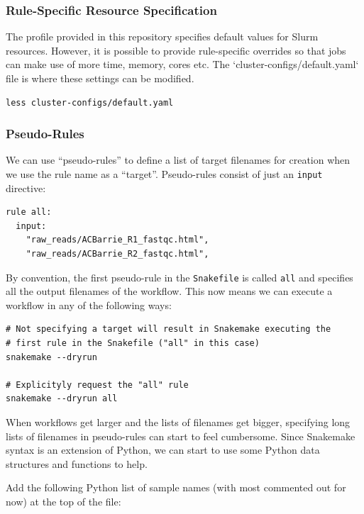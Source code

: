 \subsubsection{Rule-Specific Resource Specification}

The profile provided in this repository specifies default values for Slurm resources.
However, it is possible to provide rule-specific overrides so that jobs can make use of more time, memory, cores etc.
The `cluster-configs/default.yaml` file is where these settings can be modified.

\begin{lstlisting}
less cluster-configs/default.yaml
\end{lstlisting}

\subsubsection{Pseudo-Rules}

We can use ``pseudo-rules'' to define a list of target filenames for creation when we use the rule name as a ``target''.
Pseudo-rules consist of just an \texttt{input} directive:

\begin{lstlisting}
rule all:
  input:
    "raw_reads/ACBarrie_R1_fastqc.html",
    "raw_reads/ACBarrie_R2_fastqc.html",
\end{lstlisting}

By convention, the first pseudo-rule in the \texttt{Snakefile} is called \texttt{all} and specifies all the output filenames of the workflow.
This now means we can execute a workflow in any of the following ways:

\begin{lstlisting}
# Not specifying a target will result in Snakemake executing the
# first rule in the Snakefile ("all" in this case)
snakemake --dryrun

# Explicityly request the "all" rule
snakemake --dryrun all
\end{lstlisting}

When workflows get larger and the lists of filenames get bigger, specifying long lists of filenames in pseudo-rules can start to feel cumbersome.
Since Snakemake syntax is an extension of Python, we can start to use some Python data structures and functions to help.

Add the following Python list of sample names (with most commented out for now) at the top of the file:

